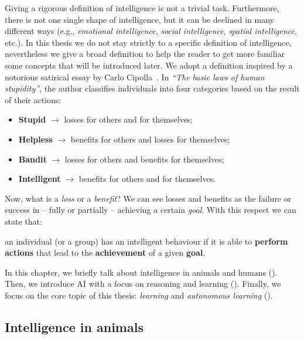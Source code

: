 Giving a rigorous definition of intelligence is not a trivial task.
%
Furthermore, there is not one single shape of intelligence, but it can be declined in many different ways (e.g., \emph{emotional intelligence}, \emph{social intelligence}, \emph{spatial intelligence}, etc.).
%
In this thesis we do not stay strictly to a specific definition of intelligence, nevertheless we give a broad definition to help the reader to get more familiar some concepts that will be introduced later.
%
We adopt a definition inspired by a notorious satirical essay by Carlo Cipolla~\cite{cipolla2013allegro}.
%
In \emph{``The basic laws of human stupidity''}, the author classifies individuals into four categories based on the result of their actions:
%
\begin{itemize}
    \item \textbf{Stupid} $\rightarrow$ losses for others and for themselves;
    \item \textbf{Helpless} $\rightarrow$ benefits for others and losses for themselves;
    \item \textbf{Bandit} $\rightarrow$ losses for others and benefits for themselves;
    \item \textbf{Intelligent} $\rightarrow$ benefits for others and for themselves.
\end{itemize}
%
Now, what is a \emph{loss} or a \emph{benefit}?
%
We can see losses and benefits as the failure or success in -- fully or partially -- achieving a certain \emph{goal}.
%
With this respect we can state that:
%
\begin{definition}
    \label{def:intelligence}
    an individual (or a group) has an intelligent behaviour if it is able to \textbf{perform actions} that lead to the \textbf{achievement} of a given \textbf{goal}.
\end{definition}


In this chapter, we briefly talk about intelligence in animals and humans ().
%
Then, we introduce \gls{AI} with a focus on reasoning and learning ().
%
Finally, we focus on the core topic of this thesis: \emph{learning} and \emph{autonomous learning} ().


\subsection{Intelligence in animals}\label{subsec:intelligence-in-animals}

